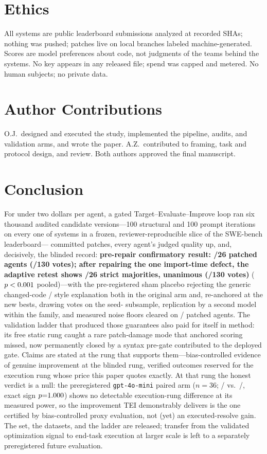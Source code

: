 \documentclass[11pt]{article}
\begin{document}
\section{Ethics}
\label{sec:ethics}
All systems are public leaderboard submissions analyzed at recorded SHAs;
nothing was pushed; patches live on local branches labeled machine-generated.
Scores are model preferences about code, not judgments of the teams behind
the systems. No key appears in any released file; spend was capped and
metered. No human subjects; no private data.

\section*{Author Contributions}
O.J.\ designed and executed the study, implemented the pipeline, audits, and
validation arms, and wrote the paper. A.Z.\ contributed to framing, task and
protocol design, and review. Both authors approved the final manuscript.

\section{Conclusion}
\label{sec:conclusion}
For under two dollars per agent, a gated Target--Evaluate--Improve loop ran
six thousand audited candidate versions---100 structural and 100 prompt
iterations on every one of \swN{} systems in a frozen,
reviewer-reproducible slice of the SWE-bench
leaderboard---\swApplied{} committed patches, every agent's judged
quality up, and, decisively, the blinded record: \textbf{pre-repair
confirmatory result: \swBlindPreMajP/26 patched agents
(\swBlindPreVotesP/130 votes); after repairing the one import-time defect,
the adaptive retest shows \swBlindMajP/26 strict majorities,
\swBlindPerfect{} unanimous (\swBlindVotesP/130 votes)}
($p<0.001$ pooled)---with the pre-registered sham placebo rejecting the
generic changed-code / style explanation both in the original arm and,
re-anchored at the new bests, drawing \swShamReVotes{} votes on the
seed-\swShamReSeed{} subsample, replication by
a second model within the family, and measured noise floors cleared on \swExceedFloorP/\swBlindAgents{}
patched agents\MDEconc. The validation ladder that produced those guarantees also
paid for itself in method: its free static rung caught a rare patch-damage
mode that anchored scoring missed, now permanently closed by a syntax pre-gate
contributed to the deployed gate. Claims are stated at the rung that
supports them---bias-controlled evidence of genuine improvement at the
blinded rung, verified outcomes reserved for the execution rung whose price
this paper quotes exactly. At that rung the honest verdict is a null: the
preregistered \texttt{gpt-4o-mini} paired arm ($n{=}36$;
\swExecPatch/\swExecN{} vs.\ \swExecBase/\swExecN, exact sign
$p{=}1.000$) shows no detectable execution-rung difference at its
measured power, so the improvement TEI demonstrably delivers is the one
certified by bias-controlled proxy evaluation, not (yet) an executed-resolve
gain. The set, the datasets, and the ladder are released; transfer from the
validated optimization signal to end-task execution at larger scale is left to
a separately preregistered future evaluation.
\end{document}
